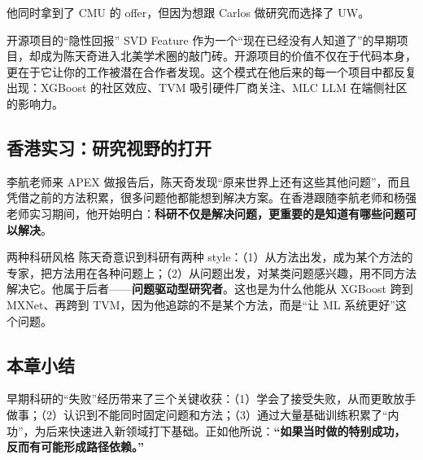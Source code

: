 他同时拿到了 CMU 的 offer，但因为想跟 Carlos 做研究而选择了 UW。

\begin{knowledgebox}{开源项目的``隐性回报''}
SVD Feature 作为一个``现在已经没有人知道了''的早期项目，却成为陈天奇进入北美学术圈的敲门砖。开源项目的价值不仅在于代码本身，更在于它让你的工作被潜在合作者发现。这个模式在他后来的每一个项目中都反复出现：XGBoost 的社区效应、TVM 吸引硬件厂商关注、MLC LLM 在端侧社区的影响力。
\end{knowledgebox}

\subsection{香港实习：研究视野的打开}

李航老师来 APEX 做报告后，陈天奇发现``原来世界上还有这些其他问题''，而且凭借之前的方法积累，很多问题他都能想到解决方案。在香港跟随李航老师和杨强老师实习期间，他开始明白：\textbf{科研不仅是解决问题，更重要的是知道有哪些问题可以解决}。

\begin{knowledgebox}{两种科研风格}
陈天奇意识到科研有两种 style：（1）从方法出发，成为某个方法的专家，把方法用在各种问题上；（2）从问题出发，对某类问题感兴趣，用不同方法解决它。他属于后者------\textbf{问题驱动型研究者}。这也是为什么他能从 XGBoost 跨到 MXNet、再跨到 TVM，因为他追踪的不是某个方法，而是``让 ML 系统更好''这个问题。
\end{knowledgebox}

\subsection{本章小结}

早期科研的``失败''经历带来了三个关键收获：（1）学会了接受失败，从而更敢放手做事；（2）认识到不能同时固定问题和方法；（3）通过大量基础训练积累了``内功''，为后来快速进入新领域打下基础。正如他所说：\textbf{``如果当时做的特别成功，反而有可能形成路径依赖。''}


